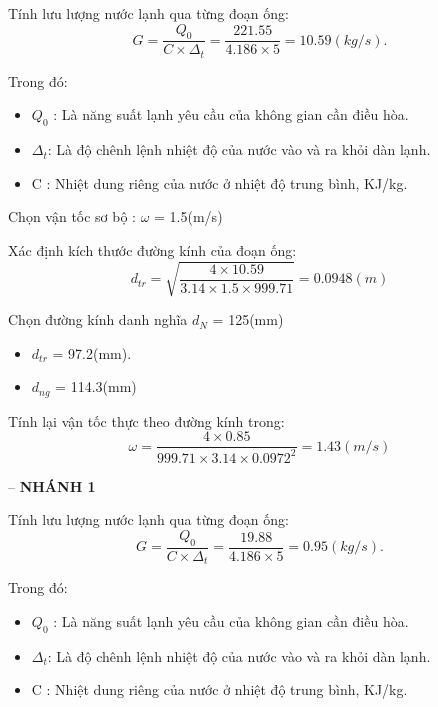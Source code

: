 Tính lưu lượng nước lạnh qua từng đoạn ống:
\begin{equation*}
	G = \dfrac{Q_{0}}{C \times \Delta_{t}} =\dfrac{221.55}{4.186 \times 5} = 10.59(kg/s).
\end{equation*}

Trong đó:
\begin{itemize}
	\item $Q_{0}$ : Là năng suất lạnh yêu cầu của không gian cần điều hòa.
	\item $\Delta_{t}$: Là độ chênh lệnh nhiệt độ của nước vào và ra khỏi dàn lạnh.
	\item C : Nhiệt dung riêng của nước ở nhiệt độ trung bình, KJ/kg.
\end{itemize}

Chọn vận tốc sơ bộ : $\omega$ = 1.5(m/s)

Xác định kích thước đường kính của đoạn ống:
\begin{equation*}
	d_{tr} = \sqrt{\dfrac{4 \times 10.59}{3.14 \times 1.5 \times 999.71}} = 0.0948(m)
\end{equation*}

Chọn đường kính danh nghĩa $d_{N}$ = 125(mm)
\begin{itemize}
	\item $d_{tr}$ = 97.2(mm).
	\item $d_{ng}$ = 114.3(mm)
\end{itemize}

Tính lại vận tốc thực theo đường kính trong:
\begin{equation*}
	\omega = \dfrac{4 \times 0.85 }{999.71 \times 3.14 \times 0.0972^{2}} = 1.43(m/s)
\end{equation*}

-- \textbf{NHÁNH 1}

Tính lưu lượng nước lạnh qua từng đoạn ống:
\begin{equation*}
	G = \dfrac{Q_{0}}{C \times \Delta_{t}} =\dfrac{19.88}{4.186 \times 5} = 0.95(kg/s).
\end{equation*}

Trong đó:
\begin{itemize}
	\item $Q_{0}$ : Là năng suất lạnh yêu cầu của không gian cần điều hòa.
	\item $\Delta_{t}$: Là độ chênh lệnh nhiệt độ của nước vào và ra khỏi dàn lạnh.
	\item C : Nhiệt dung riêng của nước ở nhiệt độ trung bình, KJ/kg.
\end{itemize}

